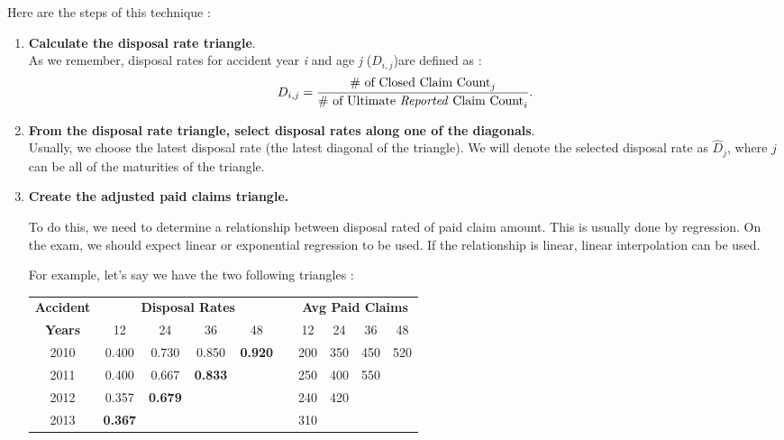 \documentclass[11pt, english]{memoir}
\numberwithin{definition}{section}
\begin{document}
	Here are the steps of this technique : 
	\begin{enumerate}
		\item \textbf{Calculate the disposal rate triangle}. \\
		As we remember, disposal rates for accident year \emph{i} and age \emph{j} ($ D_{i,j} $)are defined as : 
		\begin{align*}
		D_{i,j} = \frac{\text{\# of Closed Claim Count}_{j}}{\text{\# of Ultimate \emph{Reported} Claim Count}_{i}}.
		\end{align*}
		
		
		
		
		
		\item \textbf{From the disposal rate triangle, select disposal rates along one of the diagonals}.\\
		Usually, we choose the latest disposal rate (the latest diagonal of the triangle). We will denote the selected disposal rate as $ \hat{D}_{j}$, where $ j $ can be all of the maturities of the triangle. 
		
		
		
		
		
		
		\item \textbf{Create the adjusted paid claims triangle.} 
		
		To do this, we need to determine a relationship between disposal rated of paid claim amount. This is usually done by regression. On the exam, we should expect linear or exponential regression to be used. If the relationship is linear, linear interpolation can be used. 
		
		For example, let's say we have the two following triangles : \\
	
		\begin{tabularx}{0.75\textwidth}{ccccclcccc}
			\toprule
			\textbf{Accident} & \multicolumn{4}{c}{\textbf{Disposal Rates}} & & \multicolumn{4}{c}{\textbf{Avg  Paid Claims}}\\
			\textbf{Years} & 12 & 24 & 36 & 48 & & 12 & 24 & 36 & 48  \\
			\midrule
			2010 & 0.400 & 0.730 & 0.850 & \textbf{0.920} & &  200 & 350 & 450 & 520  \\
			2011 & 0.400 & 0.667 & \textbf{0.833} & & & 250 & 400 & 550 & \\
			2012 & 0.357 & \textbf{0.679} & & & & 240 & 420 & & \\
			2013 & \textbf{0.367} & & &  & & 310 & & & \\
			\bottomrule
		\end{tabularx}\\
		

\end{enumerate}
\end{document}
